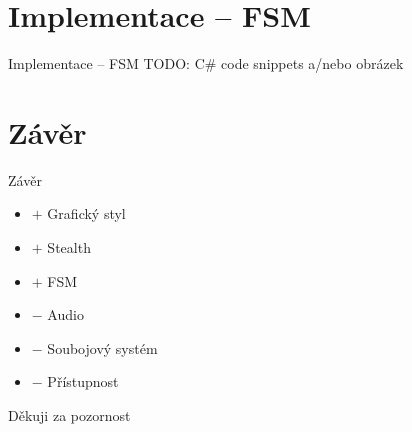 \documentclass[10pt]{beamer}
\begin{document}
	\section{Implementace – FSM}
	\begin{frame}{Implementace – FSM}
		TODO: C\# code snippets a/nebo obrázek
	\end{frame}

	\section{Závěr}
	\begin{frame}{Závěr}
		\begin{itemize}\setlength\itemsep{10pt}
			\item $+$ Grafický styl
			\item $+$ Stealth
			\item $+$ FSM
			\item $-$ Audio
			\item $-$ Soubojový systém
			\item $-$ Přístupnost
		\end{itemize}
	\end{frame}

	{
	\begin{frame}[noframenumbering] %
		Děkuji za pozornost
	\end{frame}
	}
	
\end{document}
